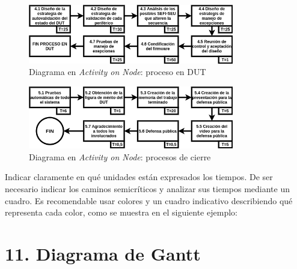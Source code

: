 \documentclass[
11pt, %
]{charter}
\begin{document}
\begin{figure}[htpb]
	\centering 
	\includegraphics[width=0.8\textwidth]{./Figuras/AoN4.png}
	\caption{Diagrama en \textit{Activity on Node}: proceso en DUT}
	\label{fig:AoN4}
\end{figure}

\begin{figure}[htpb]
	\centering 
	\includegraphics[width=0.8\textwidth]{./Figuras/AoN5.png}
	\caption{Diagrama en \textit{Activity on Node}: procesos de cierre}
	\label{fig:AoN5}
\end{figure}

Indicar claramente en qué unidades están expresados los tiempos.
De ser necesario indicar los caminos semicríticos y analizar sus tiempos mediante un cuadro.
Es recomendable usar colores y un cuadro indicativo describiendo qué representa cada color, como se muestra en el siguiente ejemplo:



\section{11. Diagrama de Gantt}
\label{sec:gantt}
\end{document}
